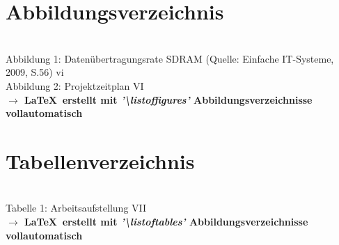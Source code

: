 \documentclass[12pt,a4paper]{article}
\newcommand\tbs{\textbackslash}		%
\newcommand{\korr}[0]{\color{corrclr}\fontsize{8pt}{9pt}\selectfont\bf} %
\begin{document}
{\section{\sc Abbildungsverzeichnis}\noindent%
	\\ Abbildung 1: Datenübertragungsrate SDRAM
	(Quelle: Einfache IT-Systeme, 2009, S.56) \dotfill vi
	\\ Abbildung 2: Projektzeitplan \dotfill VI
	\\[4mm]{\korr $\to$ \LaTeX\, erstellt mit {\em'\tbs{}listoffigures'}
	Abbildungsverzeichnisse vollautomatisch}


\section{\sc Tabellenverzeichnis}\noindent%
	\\ Tabelle 1: Arbeitsaufstellung \dotfill VII
	\\[4mm]{\korr $\to$ \LaTeX\, erstellt mit {\em'\tbs{}listoftables'}
	Abbildungsverzeichnisse vollautomatisch}










\clearpage\vfill\newpage{}
\renewcommand{\thesection}{\Roman{section}\;}
\setcounter{section}{2}
}
\end{document}
